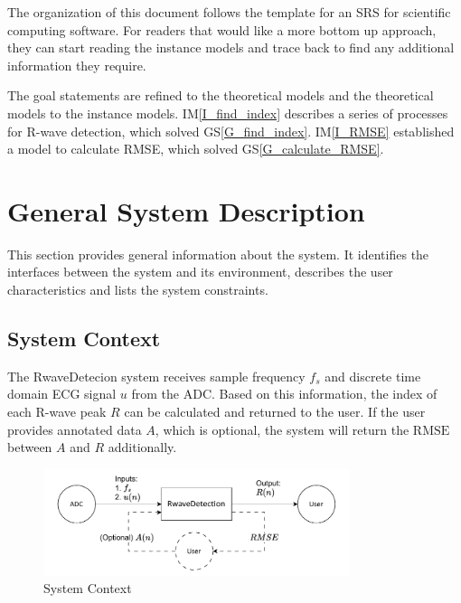 \documentclass[12pt]{article}
\newcommand{\gsref}[1]{GS\ref{#1}} \newcounter{instnum} %
\newcommand{\iref}[1]{IM\ref{#1}} \newcounter{reqnum} %
\begin{document}
The organization of this document follows the template for an SRS for scientific
computing software. For readers that would like a more bottom up approach, they
can start reading the instance models and trace back to find any additional
information they require.

The goal statements are refined to the theoretical models and the theoretical
models to the instance models.  \iref{I_find_index} describes a series of
processes for R-wave detection, which solved \gsref{G_find_index}.
\iref{I_RMSE} established a model to calculate RMSE, which solved
\gsref{G_calculate_RMSE}.

\section{General System Description}

This section provides general information about the system.  It identifies the
interfaces between the system and its environment, describes the user
characteristics and lists the system constraints.

\subsection{System Context}

The RwaveDetecion system receives sample frequency $f_s$ and discrete time
domain ECG signal $u$ from the ADC.  Based on this information, the index of
each R-wave peak $R$ can be calculated and returned to the user.  If the user
provides annotated data $A$, which is optional, the system will return the
$\text{RMSE}$ between $A$ and $R$ additionally.

\begin{figure}[h!]
\begin{center}
 \includegraphics[width=0.8\textwidth]{SystemContextFigure}
\caption{System Context}
\label{Fig_SystemContext} 
\end{center}
\end{figure}
\end{document}
